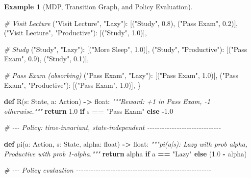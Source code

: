 \documentclass[
]{book}
\newenvironment{Shaded}{\begin{snugshade}}{\end{snugshade}}
\newcommand{\BuiltInTok}[1]{#1}
\newcommand{\CommentTok}[1]{\textcolor[rgb]{0.56,0.35,0.01}{\textit{#1}}}
\newcommand{\ControlFlowTok}[1]{\textcolor[rgb]{0.13,0.29,0.53}{\textbf{#1}}}
\newcommand{\FloatTok}[1]{\textcolor[rgb]{0.00,0.00,0.81}{#1}}
\newcommand{\KeywordTok}[1]{\textcolor[rgb]{0.13,0.29,0.53}{\textbf{#1}}}
\newcommand{\NormalTok}[1]{#1}
\newcommand{\OperatorTok}[1]{\textcolor[rgb]{0.81,0.36,0.00}{\textbf{#1}}}
\newcommand{\StringTok}[1]{\textcolor[rgb]{0.31,0.60,0.02}{#1}}
\theoremstyle{definition}
\theoremstyle{definition}
\newtheorem{example}{Example}[chapter]
\theoremstyle{definition}
\theoremstyle{definition}
\theoremstyle{remark}
\begin{document}
\begin{example}[MDP, Transition Graph, and Policy Evaluation]
\begin{Shaded}
\begin{Highlighting}[]
    \CommentTok{\# Visit Lecture}
\NormalTok{    (}\StringTok{"Visit Lecture"}\NormalTok{, }\StringTok{"Lazy"}\NormalTok{):       [(}\StringTok{"Study"}\NormalTok{, }\FloatTok{0.8}\NormalTok{), (}\StringTok{"Pass Exam"}\NormalTok{, }\FloatTok{0.2}\NormalTok{)],}
\NormalTok{    (}\StringTok{"Visit Lecture"}\NormalTok{, }\StringTok{"Productive"}\NormalTok{): [(}\StringTok{"Study"}\NormalTok{, }\FloatTok{1.0}\NormalTok{)],}

    \CommentTok{\# Study}
\NormalTok{    (}\StringTok{"Study"}\NormalTok{, }\StringTok{"Lazy"}\NormalTok{):         [(}\StringTok{"More Sleep"}\NormalTok{, }\FloatTok{1.0}\NormalTok{)],}
\NormalTok{    (}\StringTok{"Study"}\NormalTok{, }\StringTok{"Productive"}\NormalTok{):   [(}\StringTok{"Pass Exam"}\NormalTok{, }\FloatTok{0.9}\NormalTok{), (}\StringTok{"Study"}\NormalTok{, }\FloatTok{0.1}\NormalTok{)],}

    \CommentTok{\# Pass Exam (absorbing)}
\NormalTok{    (}\StringTok{"Pass Exam"}\NormalTok{, }\StringTok{"Lazy"}\NormalTok{):       [(}\StringTok{"Pass Exam"}\NormalTok{, }\FloatTok{1.0}\NormalTok{)],}
\NormalTok{    (}\StringTok{"Pass Exam"}\NormalTok{, }\StringTok{"Productive"}\NormalTok{): [(}\StringTok{"Pass Exam"}\NormalTok{, }\FloatTok{1.0}\NormalTok{)],}
\NormalTok{\}}

\KeywordTok{def}\NormalTok{ R(s: State, a: Action) }\OperatorTok{{-}\textgreater{}} \BuiltInTok{float}\NormalTok{:}
    \CommentTok{"""Reward: +1 in Pass Exam, {-}1 otherwise."""}
    \ControlFlowTok{return} \FloatTok{1.0} \ControlFlowTok{if}\NormalTok{ s }\OperatorTok{==} \StringTok{"Pass Exam"} \ControlFlowTok{else} \OperatorTok{{-}}\FloatTok{1.0}

\CommentTok{\# {-}{-}{-} Policy: time{-}invariant, state{-}independent {-}{-}{-}{-}{-}{-}{-}{-}{-}{-}{-}{-}{-}{-}{-}{-}{-}{-}{-}{-}{-}{-}{-}{-}{-}{-}{-}{-}{-}{-}}

\KeywordTok{def}\NormalTok{ pi(a: Action, s: State, alpha: }\BuiltInTok{float}\NormalTok{) }\OperatorTok{{-}\textgreater{}} \BuiltInTok{float}\NormalTok{:}
    \CommentTok{"""pi(a|s): Lazy with prob alpha, Productive with prob 1{-}alpha."""}
    \ControlFlowTok{return}\NormalTok{ alpha }\ControlFlowTok{if}\NormalTok{ a }\OperatorTok{==} \StringTok{"Lazy"} \ControlFlowTok{else}\NormalTok{ (}\FloatTok{1.0} \OperatorTok{{-}}\NormalTok{ alpha)}

\CommentTok{\# {-}{-}{-} Policy evaluation {-}{-}{-}{-}{-}{-}{-}{-}{-}{-}{-}{-}{-}{-}{-}{-}{-}{-}{-}{-}{-}{-}{-}{-}{-}{-}{-}{-}{-}{-}{-}{-}{-}{-}{-}{-}{-}{-}{-}{-}{-}{-}{-}{-}{-}{-}{-}{-}{-}{-}{-}{-}{-}{-}{-}}


\end{Highlighting}
\end{Shaded}
\end{example}
\end{document}
